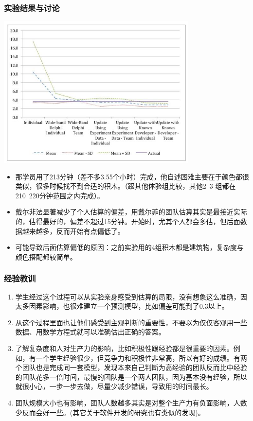 \hypertarget{ux5b9eux9a8cux7ed3ux679cux4e0eux8ba8ux8bba}{%
\subsubsection{实验结果与讨论}\label{ux5b9eux9a8cux7ed3ux679cux4e0eux8ba8ux8bba}}


\includegraphics[width=10cm]{Lego3.jpg}

\begin{itemize}
\tightlist
\item
  那学员用了213分钟（差不多3.55个小时）完成，他自述困难主要在于颜色都很类似，很多时候找不到合适的积木。（跟其他体验组比较，其他2~3 组都在210~220分钟范围之内完成）。
\item
  戴尔非法显著减少了个人估算的偏差，用戴尔菲的团队估算其实是最接近实际的，估得最好的，偏差不超过15分钟。开始时，尤其个人都会多估，但后面数据越来越多，反而开始有点偏低了。
\item
  可能导致后面估算偏低的原因：之前实验用的4组积木都是建筑物，复杂度与颜色搭配都较简单。
\end{itemize}

\hypertarget{ux7ecfux9a8cux6559ux8bad}{%
\subsubsection{经验教训}\label{ux7ecfux9a8cux6559ux8bad}}

\begin{enumerate}
\tightlist
\item
  学生经过这个过程可以从实验亲身感受到估算的局限，没有想象这么准确，因太多因素影响，也很难建立一个预测模型，比如偏差可能到了0.3以上。
\item
  从这个过程里面也让他们感受到主观判断的重要性，不要以为仅仅客观用一些数据、用数学方程式就可以准确估出正确的答案。
\item
  了解复杂度和人对生产力的影响，比如积极性跟经验都是很重要的因素。例如，有一个学生经验很少，但竞争力和积极性非常高，所以有好的成绩。有两个团队也是完成同一套模型，发现本来自己判断为高经验的团队反而比中经验的团队花多一倍时间，最慢的团队是一个两人团队，因为基本没有经验，所以就很小心，一步一步去做，尽量少减少错误，导致用的时间最长。
\item
  团队规模大小也有影响，团队人数越多其实是对整个生产力有负面影响，人数少反而会好一些。(其它关于软件开发的研究也有类似的发现)。
\end{enumerate}

